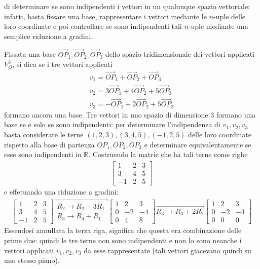 di determinare se sono indipendenti i vettori in un qualunque spazio
vettoriale: infatti, basta fissare una base, rappresentare i vettori
mediante le $n$-uple delle loro coordinate e poi controllare se sono
indipendenti tali $n$-uple mediante una semplice riduzione a gradini.
\begin{es}
  Fissata una base $\vec{OP}_1,\vec{OP}_2,\vec{OP}_3$ dello spazio
  tridimensionale dei vettori applicati $V_O^3$, si dica se i tre vettori
  applicati
  \begin{eqnarray*}
    v_1=\vec{OP}_1+\vec{OP}_2+\vec{OP}_3\\
    v_2=3\vec{OP}_1+4\vec{OP}_2+5\vec{OP}_3\\
    v_3=-\vec{OP}_1+2\vec{OP}_2+5\vec{OP}_3
  \end{eqnarray*}
  formano ancora una base.
  Tre vettori in uno spazio di dimensione 3 formano una base se e solo se
  sono indipendenti: per determinare l'indipendenza di $v_1,v_2,v_3$ basta
  considerare le terne $(1,2,3),(3,4,5),(-1,2,5)$ delle loro coordinate
  rispetto alla base di partenza $OP_1,OP_2,OP_3$ e determinare
  equivalentamente se esse sono indipendenti in $\mathds{R}$.
  \clearpage
  Costruendo la matrie che ha tali terne come righe
  \begin{eqnarray*}
    \begin{bmatrix}
      1 & 2 & 3\\
      3 & 4 & 5\\
      -1 & 2 & 5
    \end{bmatrix}
  \end{eqnarray*}
  e effetuando una riduzione a gradini:
  \begin{eqnarray*}
    \begin{bmatrix}
      1 & 2 & 3\\
      3 & 4 & 5\\
      -1 & 2 & 5
    \end{bmatrix}\overrightarrow{
    \begin{matrix}
      R_2\to R_2-3R_1\\
      R_3\to R_4+R_1
    \end{matrix}
    }
    \begin{bmatrix}
      1 & 2 & 3\\
      0 & -2 & -4\\
      0 & 4 & 8
    \end{bmatrix}
    \overrightarrow{R_3\to R_3+2R_2}
    \begin{bmatrix}
      1 & 2 & 3\\
      0 & -2 & -4\\
      0 & 0 & 0
    \end{bmatrix}
  \end{eqnarray*}
  Essendosi annullata la terza riga, significa che questa era
  combinazione delle prime due: quindi le tre terne non sono indipendenti
  e non lo sono neanche i vettori applicati $v_1,v_2,v_3$ da esse
  rappresentate (tali vettori giacevano quindi su uno stesso piano).
\end{es}

